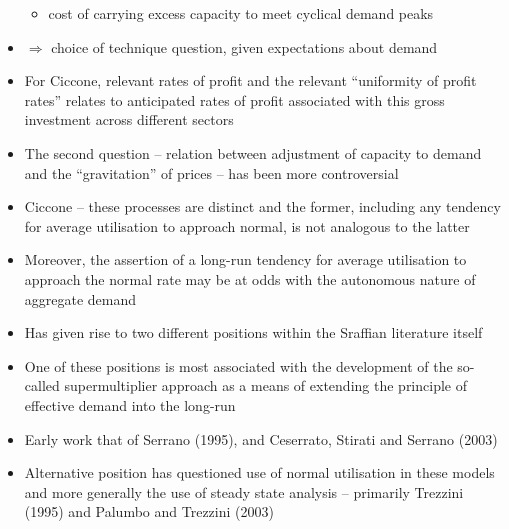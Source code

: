\documentclass[a4paper,twoside]{article}
\numberwithin{equation}{section}
\numberwithin{figure}{section}
\begin{document}
\begin{itemize}
\begin{itemize}
			\item cost of carrying excess capacity to meet cyclical demand peaks
		\end{itemize}
		\item \( \Rightarrow \) choice of technique question, given expectations about demand
		\item For Ciccone, relevant rates of profit and the relevant ``uniformity of profit rates'' relates to anticipated rates of profit associated with this gross investment across different sectors 
		\item The second question -- relation between adjustment of capacity to demand and the ``gravitation'' of prices -- has been more controversial
		\item Ciccone -- these processes are distinct and the former, including any tendency for average utilisation to approach normal, is not analogous to the latter
		\item Moreover, the assertion of a long-run tendency for average utilisation to approach the normal rate may be at odds with the autonomous nature of aggregate demand
		\item Has given rise to two different positions within the Sraffian literature itself
		\item One of these positions is most associated with the development of the so-called supermultiplier approach as a means of extending the principle of effective demand into the long-run
		\item Early work that of Serrano (1995), and Ceserrato, Stirati and Serrano (2003)
		\item Alternative position has questioned use of normal utilisation in these models and more generally the use of steady state analysis -- primarily Trezzini (1995) and Palumbo and Trezzini (2003)
	\end{itemize}
\end{document}

